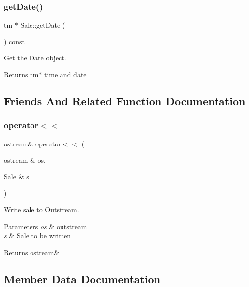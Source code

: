 \subsubsection{\texorpdfstring{get\+Date()}{getDate()}}
{\footnotesize\ttfamily tm $\ast$ Sale\+::get\+Date (\begin{DoxyParamCaption}{ }\end{DoxyParamCaption}) const}



Get the Date object. 

\begin{DoxyReturn}{Returns}
tm$\ast$ time and date 
\end{DoxyReturn}


\subsection{Friends And Related Function Documentation}
\mbox{\label{classSale_a3dc1c9b3c685b4a1d9553083be9c3fbf}} 
\subsubsection{\texorpdfstring{operator$<$$<$}{operator<<}}
{\footnotesize\ttfamily ostream\& operator$<$$<$ (\begin{DoxyParamCaption}\item[{ostream \&}]{os,  }\item[{\hyperlink{classSale}{Sale} \&}]{s }\end{DoxyParamCaption})\hspace{0.3cm}{\ttfamily [friend]}}



Write sale to Outstream. 


\begin{DoxyParams}{Parameters}
{\em os} & outstream \\
\hline
{\em s} & \hyperlink{classSale}{Sale} to be written \\
\hline
\end{DoxyParams}
\begin{DoxyReturn}{Returns}
ostream\& 
\end{DoxyReturn}


\subsection{Member Data Documentation}
\mbox{\label{classSale_ad86ea33bedf6450d06a90442eca79053}} 
